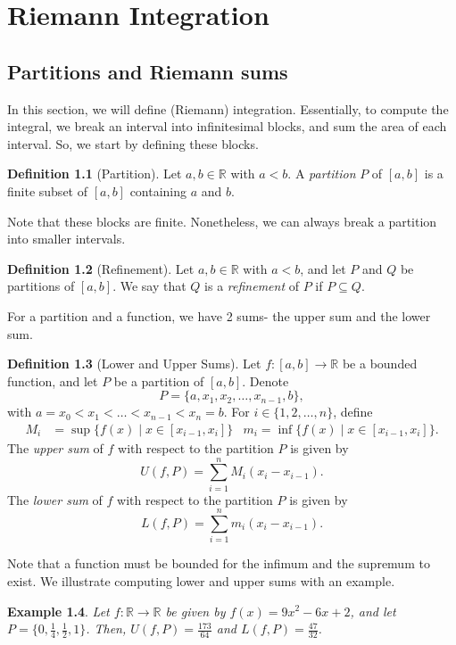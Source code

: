 \documentclass[a4paper, openany]{memoir}
\theoremstyle{definition}
\newtheorem{definition}{Definition}[section]
\theoremstyle{plain}
\newtheorem{example}[definition]{Example}
\begin{document}
\chapter{Riemann Integration}
\section{Partitions and Riemann sums}
In this section, we will define (Riemann) integration. Essentially, to compute the integral, we break an interval into infinitesimal blocks, and sum the area of each interval. So, we start by defining these blocks.
\begin{definition}[Partition]
Let $a, b \in \mathbb{R}$ with $a < b$. A \emph{partition} $P$ of $[a, b]$ is a finite subset of $[a, b]$ containing $a$ and $b$.
\end{definition}
\noindent Note that these blocks are finite. Nonetheless, we can always break a partition into smaller intervals.
\begin{definition}[Refinement]
Let $a, b \in \mathbb{R}$ with $a < b$, and let $P$ and $Q$ be partitions of $[a, b]$. We say that $Q$ is a \emph{refinement} of $P$ if $P \subseteq Q$.
\end{definition}
For a partition and a function, we have 2 sums- the upper sum and the lower sum.
\begin{definition}[Lower and Upper Sums]
Let $f: [a, b] \to \mathbb{R}$ be a bounded function, and let $P$ be a partition of $[a, b]$. Denote
\[P = \{a, x_1, x_2, \dots, x_{n-1}, b\},\]
with $a = x_0 < x_1 < \dots < x_{n-1} < x_n = b$. For $i \in \{1, 2, \dots, n\}$, define
\begin{align*}
    M_i &= \sup \{f(x) \mid x \in [x_{i-1}, x_i]\} & m_i = \inf \{f(x) \mid x \in [x_{i-1}, x_i]\}.
\end{align*}
The \emph{upper sum} of $f$ with respect to the partition $P$ is given by
\[U(f, P) = \sum_{i=1}^n M_i (x_i - x_{i-1}).\]
The \emph{lower sum} of $f$ with respect to the partition $P$ is given by
\[L(f, P) = \sum_{i=1}^n m_i (x_i - x_{i-1}).\]
\end{definition}
\noindent Note that a function must be bounded for the infimum and the supremum to exist. We illustrate computing lower and upper sums with an example.
\begin{example}
Let $f: \mathbb{R} \to \mathbb{R}$ be given by $f(x) = 9x^2 - 6x + 2$, and let $P = \{0, \frac{1}{4}, \frac{1}{2}, 1\}$. Then, $U(f, P) = \frac{173}{64}$ and $L(f, P) = \frac{47}{32}$.
\end{example}
\end{document}
